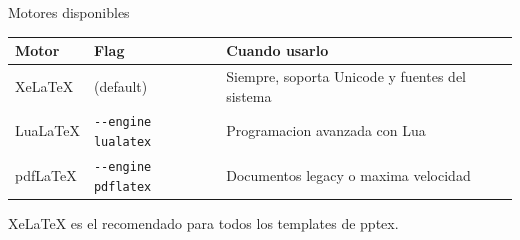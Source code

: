 \begin{frame}{Motores disponibles}
  \begin{table}
    \centering
    \begin{tabular}{lll}
      \toprule
      Motor       & Flag              & Cuando usarlo \\
      \midrule
      XeLaTeX     & (default)         & Siempre, soporta Unicode y fuentes del sistema \\
      LuaLaTeX    & \texttt{-{}-engine lualatex} & Programacion avanzada con Lua \\
      pdfLaTeX    & \texttt{-{}-engine pdflatex} & Documentos legacy o maxima velocidad \\
      \bottomrule
    \end{tabular}
  \end{table}

  \vspace{0.5em}
  \alert{XeLaTeX es el recomendado} para todos los templates de pptex.
\end{frame}
